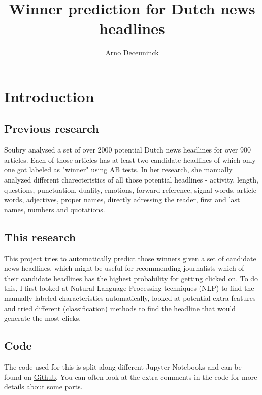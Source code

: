 \documentclass{article}
\title{Winner prediction for Dutch news headlines}
\author{Arno Deceuninck}
\begin{document}
\maketitle

\tableofcontents

\section{Introduction}
\subsection{Previous research}
Soubry \cite{soubry} analysed a set of over 2000 potential Dutch news headlines for over 900  articles. Each of those articles has at least two candidate headlines of which only one got labeled as "winner" using AB tests. In her research, she manually analyzed different charecteristics of all those potential headlines - activity, length, questions, punctuation, duality, emotions, forward reference, signal words, article words, adjectives, proper names, directly adressing the reader, first and last names, numbers and quotations. \cite{soubry}

\subsection{This research}
This project tries to automatically predict those winners given a set of candidate news headlines, which might be useful for recommending journalists which of their candidate headlines has the highest probability for getting clicked on. To do this, I first looked at Natural Language Processing techniques (NLP) to find the manually labeled characteristics automatically, looked at potential extra features and tried different (classification) methods to find the headline that would generate the most clicks.

\subsection{Code}
The code used for this is split along different Jupyter Notebooks and can be found on
\href{https://github.com/arnodeceuninck/news-headlines-research}{Github}. You can often look at the extra comments in the code for more details about some parts.
\end{document}
